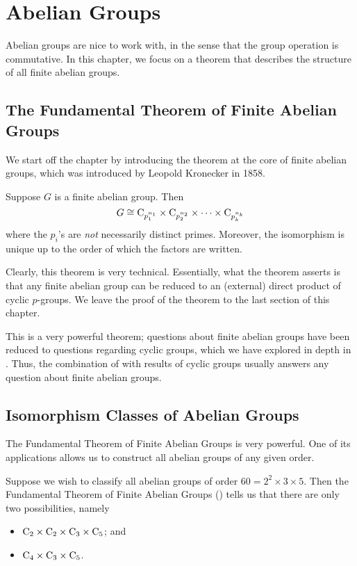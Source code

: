 \chapter{Abelian Groups}
Abelian groups are nice to work with, in the sense that the group operation is commutative. In this chapter, we focus on a theorem that describes the structure of all finite abelian groups.

\section{The Fundamental Theorem of Finite Abelian Groups}
We start off the chapter by introducing the theorem at the core of finite abelian groups, which was introduced by Leopold Kronecker in 1858.

\begin{theorem}\label{thrm-fundamental-theorem-of-finite-abelian-groups}
    Suppose $G$ is a finite abelian group. Then
    \[
        G \cong \mathrm{C}_{p_1^{n_1}} \times \mathrm{C}_{p_2^{n_2}} \times \cdots \times \mathrm{C}_{p_k^{n_k}}
    \]
    where the $p_i$'s are \textit{not} necessarily distinct primes. Moreover, the isomorphism is unique up to the order of which the factors are written.
\end{theorem}

Clearly, this theorem is very technical. Essentially, what the theorem asserts is that any finite abelian group can be reduced to an (external) direct product of cyclic $p$-groups. We leave the proof of the theorem to the last section of this chapter.

This is a very powerful theorem; questions about finite abelian groups have been reduced to questions regarding cyclic groups, which we have explored in depth in . Thus, the combination of  with results of cyclic groups usually answers any question about finite abelian groups.

\section{Isomorphism Classes of Abelian Groups}
The Fundamental Theorem of Finite Abelian Groups is very powerful. One of its applications allows us to construct all abelian groups of any given order.

\begin{example}
    Suppose we wish to classify all abelian groups of order $60 = 2^2 \times 3 \times 5$. Then the Fundamental Theorem of Finite Abelian Groups () tells us that there are only two possibilities, namely
    \begin{itemize}
        \item $\mathrm{C}_{2} \times \mathrm{C}_{2} \times \mathrm{C}_{3} \times \mathrm{C}_{5}$; and
        \item $\mathrm{C}_{4} \times \mathrm{C}_{3} \times \mathrm{C}_{5}$.
    \end{itemize}
\end{example}

